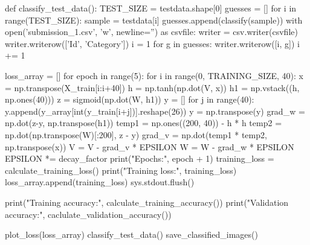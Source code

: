 \documentclass{article}
\begin{document}
\begin{python}
def classify_test_data():
    TEST_SIZE = testdata.shape[0]
    guesses = []
    for i in range(TEST_SIZE):
        sample = testdata[i]
        guesses.append(classify(sample))
    with open('submission_1.csv', 'w', newline='') as csvfile:
        writer = csv.writer(csvfile)
        writer.writerow(['Id', 'Category'])
        i = 1
        for g in guesses:
            writer.writerow([i, g])
            i += 1


loss_array = []
for epoch in range(5):
    for i in range(0, TRAINING_SIZE, 40):
        x = np.transpose(X_train[i:i+40])
        h = np.tanh(np.dot(V, x))
        h1 = np.vstack((h, np.ones(40)))
        z = sigmoid(np.dot(W, h1))
        y = []
        for j in range(40):
            y.append(y_array[int(y_train[i+j])].reshape(26))
        y = np.transpose(y)
        grad_w = np.dot(z-y, np.transpose(h1))
        temp1 = np.ones((200, 40)) - h * h
        temp2 = np.dot(np.transpose(W)[:200], z - y)
        grad_v = np.dot(temp1 * temp2, np.transpose(x))
        V = V - grad_v * EPSILON
        W = W - grad_w * EPSILON
    EPSILON *= decay_factor
    print("Epochs:", epoch + 1)
    training_loss = calculate_training_loss()
    print("Training loss:", training_loss)
    loss_array.append(training_loss)
    sys.stdout.flush()

print("Training accuracy:", calculate_training_accuracy())
print("Validation accuracy:", caclulate_validation_accuracy())

plot_loss(loss_array)
classify_test_data()
save_classified_images()
\end{python}
\end{document}
